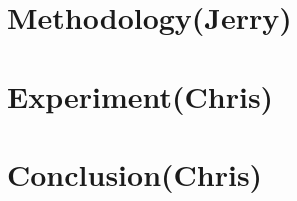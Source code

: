 \section{Methodology(Jerry)}
\label{sec:method}

\section{Experiment(Chris)}
\label{sec:experiment}


\section{Conclusion(Chris)}
\label{sec:conclusion}







